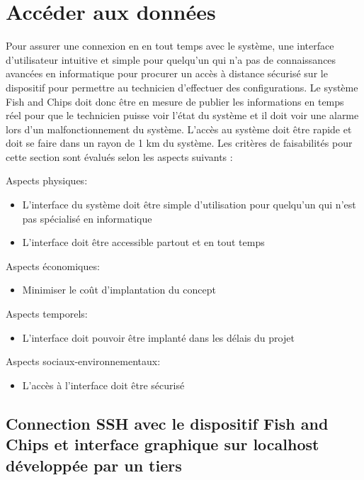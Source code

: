 

\section{Accéder aux données}
\label{s:faisab_acceder}
Pour assurer une connexion en en tout temps avec le système, une interface d’utilisateur intuitive et simple pour quelqu’un qui n’a pas de connaissances avancées en informatique pour procurer un accès à distance sécurisé sur le dispositif pour permettre au technicien d’effectuer des configurations. Le système Fish and Chips doit donc être en mesure de publier les informations en temps réel pour que le technicien puisse voir l’état du système et il doit voir une alarme lors d’un malfonctionnement du système. L’accès au système doit être rapide et doit se faire dans un rayon de 1 km du système. Les critères de faisabilités pour cette section sont évalués selon les aspects suivants :

Aspects physiques:
\begin{itemize}
	\item L’interface du système doit être simple d’utilisation pour quelqu’un qui n’est pas spécialisé en informatique
	\item L’interface doit être accessible partout et en tout temps
\end{itemize}

Aspects économiques:
\begin{itemize}
	\item Minimiser le coût d’implantation du concept
\end{itemize}

Aspects temporels:
\begin{itemize}
	\item L’interface doit pouvoir être implanté dans les délais du projet
\end{itemize}

Aspects sociaux-environnementaux:
\begin{itemize}
	\item L’accès à l’interface doit être sécurisé
\end{itemize}

\subsection{Connection SSH avec le dispositif Fish and Chips et interface graphique sur localhost développée par un tiers}

